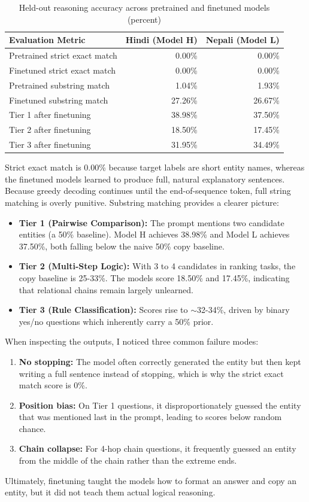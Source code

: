 \documentclass[11pt,a4paper]{article}
\begin{document}
\begin{table}[htbp]
\centering
\caption{Held-out reasoning accuracy across pretrained and finetuned models (percent)}
\begin{tabular}{p{6.1cm}rr}
\toprule
\textbf{Evaluation Metric} & \textbf{Hindi (Model H)} & \textbf{Nepali (Model L)} \\
\midrule
Pretrained strict exact match & 0.00\% & 0.00\% \\
Finetuned strict exact match & 0.00\% & 0.00\% \\
Pretrained substring match & 1.04\% & 1.93\% \\
Finetuned substring match & 27.26\% & 26.67\% \\
Tier 1 after finetuning & 38.98\% & 37.50\% \\
Tier 2 after finetuning & 18.50\% & 17.45\% \\
Tier 3 after finetuning & 31.95\% & 34.49\% \\
\bottomrule
\end{tabular}
\end{table}

Strict exact match is 0.00\% because target labels are short entity names, whereas the finetuned models learned to produce full, natural explanatory sentences. Because greedy decoding continues until the end-of-sequence token, full string matching is overly punitive. Substring matching provides a clearer picture:
\begin{itemize}
\item \textbf{Tier 1 (Pairwise Comparison):} The prompt mentions two candidate entities (a 50\% baseline). Model H achieves 38.98\% and Model L achieves 37.50\%, both falling below the naive 50\% copy baseline. 
\item \textbf{Tier 2 (Multi-Step Logic):} With 3 to 4 candidates in ranking tasks, the copy baseline is 25-33\%. The models score 18.50\% and 17.45\%, indicating that relational chains remain largely unlearned.
\item \textbf{Tier 3 (Rule Classification):} Scores rise to $\sim$32-34\%, driven by binary yes/no questions which inherently carry a 50\% prior.
\end{itemize}

When inspecting the outputs, I noticed three common failure modes:
\begin{enumerate}
\item \textbf{No stopping:} The model often correctly generated the entity but then kept writing a full sentence instead of stopping, which is why the strict exact match score is 0\%.
\item \textbf{Position bias:} On Tier 1 questions, it disproportionately guessed the entity that was mentioned last in the prompt, leading to scores below random chance.
\item \textbf{Chain collapse:} For 4-hop chain questions, it frequently guessed an entity from the middle of the chain rather than the extreme ends.
\end{enumerate}
Ultimately, finetuning taught the models how to format an answer and copy an entity, but it did not teach them actual logical reasoning. 
\end{document}
